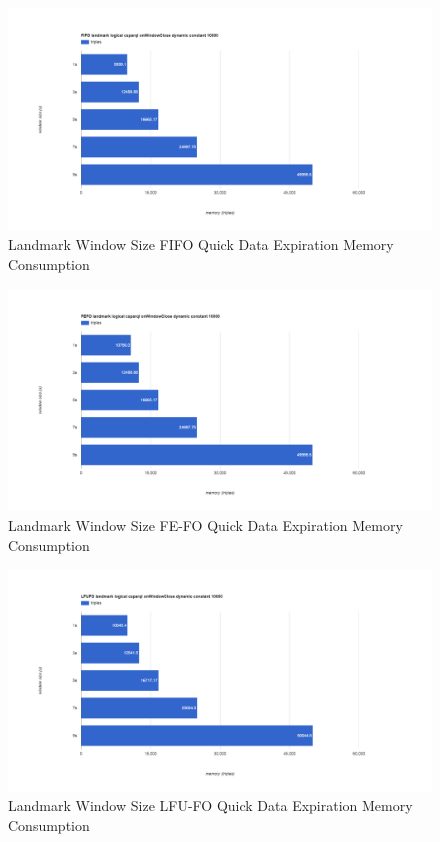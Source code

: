 \begin{figure}[!htbp]
	\centering
    \includegraphics[width=\textwidth]{img/app3-land-ws-fifo-quick-m.png}
    \caption{Landmark Window Size FIFO Quick Data Expiration Memory Consumption}
\end{figure}
\begin{figure}[!htbp]
	\centering
    \includegraphics[width=\textwidth]{img/app3-land-ws-fefo-quick-m.png}
    \caption{Landmark Window Size FE-FO Quick Data Expiration Memory Consumption}
\end{figure}
\begin{figure}[!htbp]
	\centering
    \includegraphics[width=\textwidth]{img/app3-land-ws-lfufo-quick-m.png}
    \caption{Landmark Window Size LFU-FO Quick Data Expiration Memory Consumption}
\end{figure}
